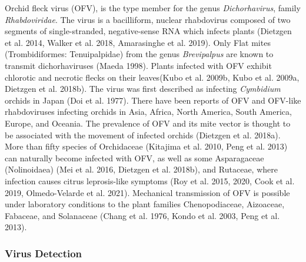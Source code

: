 \documentclass[12pt,final,CPage]{ufthesis}
\begin{document}
{  \pagebreak

  Orchid fleck virus (OFV), is the type member for the genus \emph{Dichorhavirus}, family \emph{Rhabdoviridae}. The virus is a bacilliform, nuclear rhabdovirus composed of two segments of single-stranded, negative-sense RNA which infects plants (Dietzgen et al. 2014, Walker et al. 2018, Amarasinghe et al. 2019). Only Flat mites (Trombidiformes: Tenuipalpidae) from the genus \emph{Brevipalpus} are known to transmit dichorhaviruses (Maeda 1998). Plants infected with OFV exhibit chlorotic and necrotic flecks on their leaves(Kubo et al. 2009b, Kubo et al. 2009a, Dietzgen et al. 2018b). The virus was first described as infecting \emph{Cymbidium} orchids in Japan (Doi et al. 1977). There have been reports of OFV and OFV-like rhabdoviruses infecting orchids in Asia, Africa, North America, South America, Europe, and Oceania. The prevalence of OFV and its mite vector is thought to be associated with the movement of infected orchids (Dietzgen et al. 2018a). More than fifty species of Orchidaceae (Kitajima et al. 2010, Peng et al. 2013) can naturally become infected with OFV, as well as some Asparagaceae (Nolinoidaea) (Mei et al. 2016, Dietzgen et al. 2018b), and Rutaceae, where infection causes citrus leprosis-like symptoms (Roy et al. 2015, 2020, Cook et al. 2019, Olmedo-Velarde et al. 2021). Mechanical transmission of OFV is possible under laboratory conditions to the plant families Chenopodiaceae, Aizoaceae, Fabaceae, and Solanaceae (Chang et al. 1976, Kondo et al. 2003, Peng et al. 2013).

  \hypertarget{virus-detection}{%
  \subsubsection{Virus Detection}\label{virus-detection}}

}
\end{document}
